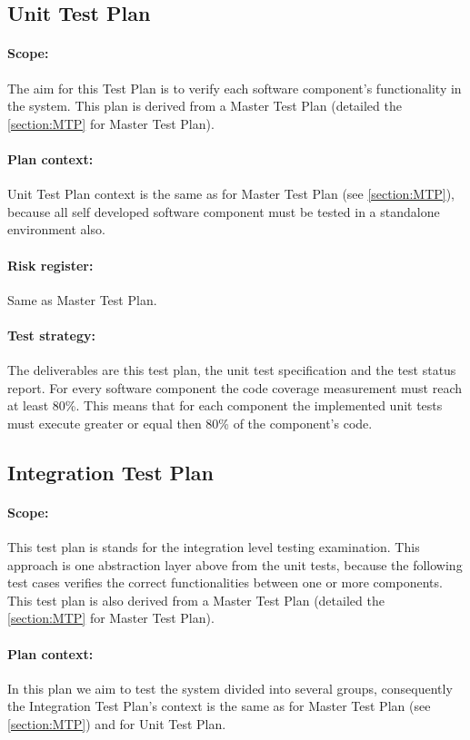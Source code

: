 \subsection{Unit Test Plan}\label{ssection:UTP}
\paragraph{Scope:} The aim for this Test Plan is to verify each software component's functionality in the system. This plan is derived from a Master Test Plan (detailed the \autoref{section:MTP} for Master Test Plan). 
\paragraph{Plan context:} Unit Test Plan context is the same as for Master Test Plan (see \autoref{section:MTP}), because all self developed software component must be tested in a standalone environment also. 
\paragraph{Risk register:} Same as Master Test Plan.
\paragraph{Test strategy:} The deliverables are this test plan, the unit test specification and the test status report. For every software component the code coverage measurement must reach at least 80\%. This means that for each component the implemented unit tests must execute greater or equal then 80\% of the component's code.

\subsection{Integration Test Plan}\label{ssection:ITP}
\paragraph{Scope:} This test plan is stands for the integration level testing examination. This approach is one abstraction layer above from the unit tests, because the following test cases verifies the correct functionalities between one or more components. This test plan is also derived from a Master Test Plan (detailed the \autoref{section:MTP} for Master Test Plan).
\paragraph{Plan context:} In this plan we aim to test the system divided into several groups, consequently the Integration Test Plan's context is the same as for Master Test Plan (see \autoref{section:MTP}) and for Unit Test Plan.
